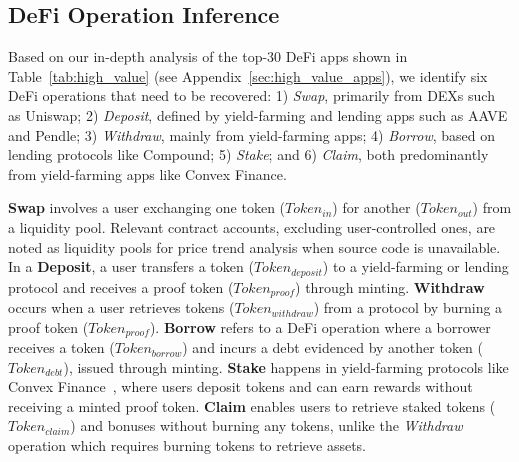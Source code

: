 \subsection{DeFi Operation Inference}
\label{sec:searchDeFiOperation}

Based on our in-depth analysis of the top-30 DeFi apps shown in Table~\ref{tab:high_value} (see Appendix~\ref{sec:high_value_apps}), we identify six DeFi operations that need to be recovered:
1) \textit{Swap}, primarily from DEXs such as Uniswap; 
2) \textit{Deposit}, defined by yield-farming and lending apps such as AAVE and Pendle; 
3) \textit{Withdraw}, mainly from yield-farming apps; 
4) \textit{Borrow}, based on lending protocols like Compound; 
5) \textit{Stake}; and 6) \textit{Claim}, both predominantly from yield-farming apps like Convex Finance.


\textbf{Swap} involves a user exchanging one token ($Token_{in}$) for another ($Token_{out}$) from a liquidity pool. Relevant contract accounts, excluding user-controlled ones, are noted as liquidity pools for price trend analysis when source code is unavailable.
In a \textbf{Deposit}, a user transfers a token ($Token_{deposit}$) to a yield-farming or lending protocol and receives a proof token ($Token_{proof}$) through minting. %
\textbf{Withdraw} occurs when a user retrieves tokens ($Token_{withdraw}$) from a protocol by burning a proof token ($Token_{proof}$).
\textbf{Borrow} refers to a DeFi operation where a borrower receives a token ($Token_{borrow}$) and incurs a debt evidenced by another token ($Token_{debt}$), issued through minting.
\textbf{Stake} happens in yield-farming protocols like Convex Finance~\cite{convex_fi}, where users deposit tokens and can earn rewards without receiving a minted proof token.
\textbf{Claim} enables users to retrieve staked tokens ($Token_{claim}$) and bonuses without burning any tokens, unlike the \textit{Withdraw} operation which requires burning tokens to retrieve assets.


